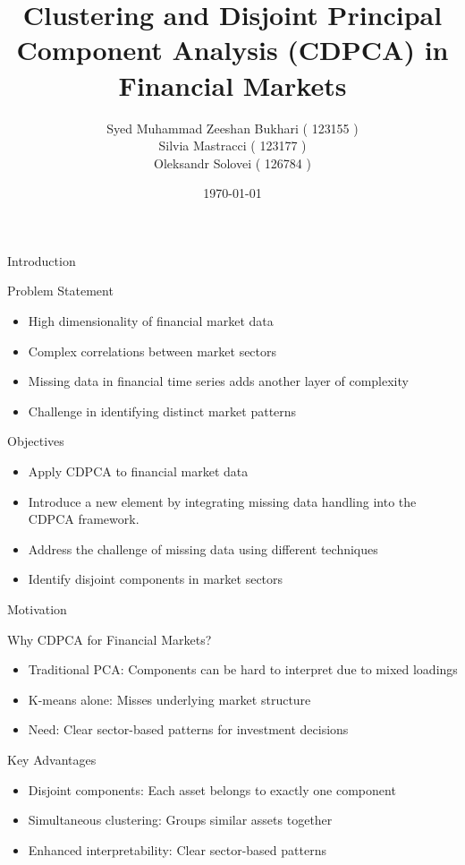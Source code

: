 \documentclass{beamer}
\title{Clustering and Disjoint Principal Component Analysis (CDPCA) in Financial Markets}
\author[123155/123177/126784]{Syed Muhammad Zeeshan Bukhari ( 123155 )\\
Silvia Mastracci ( 123177 )\\
Oleksandr Solovei ( 126784 )
}
\date{\today}
\begin{document}
\begin{frame}
    \titlepage
\end{frame}

\begin{frame}{Introduction}
    \begin{block}{Problem Statement}
        \begin{itemize}
            \item High dimensionality of financial market data
            \item Complex correlations between market sectors
            \item Missing data in financial time series adds another layer of complexity
            \item Challenge in identifying distinct market patterns
        \end{itemize}
    \end{block}

    \begin{block}{Objectives}
        \begin{itemize}
            \item Apply CDPCA to financial market data
            \item Introduce a new element by integrating missing data handling into the CDPCA framework.
            \item Address the challenge of missing data using different techniques
            \item Identify disjoint components in market sectors
        \end{itemize}
    \end{block}
\end{frame}

\begin{frame}{Motivation}
    \begin{block}{Why CDPCA for Financial Markets?}
        \begin{itemize}
            \item Traditional PCA: Components can be hard to interpret due to mixed loadings
            \item K-means alone: Misses underlying market structure
            \item Need: Clear sector-based patterns for investment decisions
        \end{itemize}
    \end{block}

    \begin{block}{Key Advantages}
        \begin{itemize}
            \item Disjoint components: Each asset belongs to exactly one component
            \item Simultaneous clustering: Groups similar assets together
            \item Enhanced interpretability: Clear sector-based patterns
        \end{itemize}
    \end{block}
\end{frame}
\end{document}
